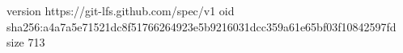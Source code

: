 version https://git-lfs.github.com/spec/v1
oid sha256:a4a7a5e71521dc8f51766264923e5b9216031dcc359a61e65bf03f10842597fd
size 713
